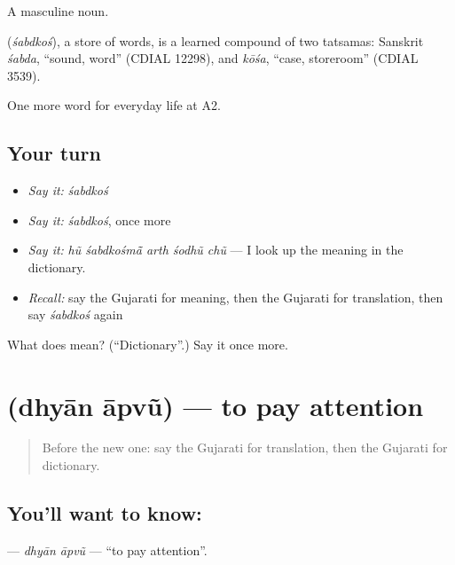 A masculine noun.

\begin{cousinweb}
\textbf{} (\emph{śabdkoś}), a store of words, is a learned compound of two tatsamas: Sanskrit \emph{śabda}, \textquotedblleft{}sound, word\textquotedblright{} (CDIAL 12298), and \emph{kōśa}, \textquotedblleft{}case, storeroom\textquotedblright{} (CDIAL 3539).
\end{cousinweb}

\begin{grammarlens}[title={What you've built}]
One more word for everyday life at A2.
\end{grammarlens}

\subsection*{Your turn}
\begin{itemize}
\raggedright
  \item \emph{Say it:} \emph{śabdkoś}
  \item \emph{Say it:} \emph{śabdkoś}, once more
  \item \emph{Say it:} \emph{hũ śabdkośmā̃ arth śodhũ chũ} — I look up the meaning in the dictionary.
  \item \emph{Recall:} say the Gujarati for meaning, then the Gujarati for translation, then say \emph{śabdkoś} again
\end{itemize}

\begin{tcolorbox}[breakable,colback=teal!4,colframe=teal!35!black,title={Before you move on}]
What does  mean? (\textquotedblleft{}Dictionary\textquotedblright{}.) Say it once more.
\end{tcolorbox}
\section[\texorpdfstring{\gu{ધ્યાન} \gu{આપવું} (dhyān āpvũ)}{ધ્યાન આપવું (dhyān āpvũ)}]{  (dhyān āpvũ) — to pay attention}

\label{lesson:GU-C251-dhyan-apvu}



\begin{quote}
Before the new one: say the Gujarati for translation, then the Gujarati for dictionary.
\end{quote}

\subsection*{You'll want to know:  }
\textbf{ } — \emph{dhyān āpvũ} — \textquotedblleft{}to pay attention\textquotedblright{}.

